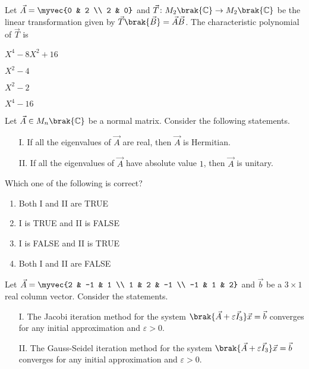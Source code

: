 \item Let $\vec{A} = \myvec{0 & 2 \\ 2 & 0}$ and $\vec{T} \colon M_2\brak{\mathbb{C}} \to M_2\brak{\mathbb{C}}$ be the linear transformation given by $\vec{T}\brak{\vec{B}} = \vec{A}\vec{B}$. The characteristic polynomial of $\vec{T}$ is \hfill{}
\begin{enumerate}
    \begin{multicols}{4}
    \item $X^4 - 8X^2 + 16$
    \item $X^2 - 4$
    \item $X^2 - 2$
    \item $X^4 - 16$
    \end{multicols}
\end{enumerate}
\item Let $\vec{A} \in M_n\brak{\mathbb{C}}$ be a normal matrix. Consider the following statements.
\begin{enumerate}
    \item[I.] If all the eigenvalues of $\vec{A}$ are real, then $\vec{A}$ is Hermitian.
    \item[II.] If all the eigenvalues of $\vec{A}$ have absolute value $1$, then $\vec{A}$ is unitary.
\end{enumerate}
Which one of the following is correct? \hfill{}
\begin{enumerate}
    \item Both I and II are TRUE
    \item I is TRUE and II is FALSE
    \item I is FALSE and II is TRUE
    \item Both I and II are FALSE
\end{enumerate}
\item Let $\vec{A} = \myvec{2 & -1 & 1 \\ 1 & 2 & -1 \\ -1 & 1 & 2}$ and $\vec{b}$ be a $3 \times 1$ real column vector. Consider the statements.
\begin{enumerate}
    \item[I.] The Jacobi iteration method for the system $\brak{\vec{A} + \varepsilon \vec{I}_3}\vec{x} = \vec{b}$ converges for any initial approximation and $\varepsilon > 0$.
    \item[II.] The Gauss-Seidel iteration method for the system $\brak{\vec{A} + \varepsilon \vec{I}_3}\vec{x} = \vec{b}$ converges for any initial approximation and $\varepsilon > 0$.
\end{enumerate}
